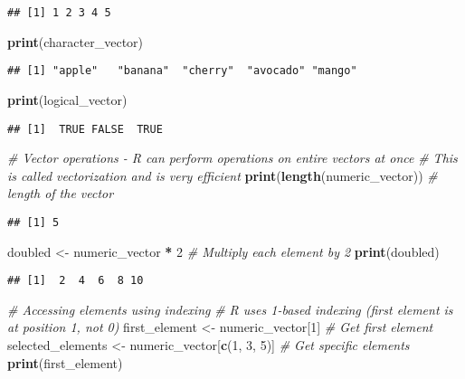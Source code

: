 \documentclass[
]{book}
\newenvironment{Shaded}{\begin{snugshade}}{\end{snugshade}}
\newcommand{\CommentTok}[1]{\textcolor[rgb]{0.56,0.35,0.01}{\textit{#1}}}
\newcommand{\DecValTok}[1]{\textcolor[rgb]{0.00,0.00,0.81}{#1}}
\newcommand{\FunctionTok}[1]{\textcolor[rgb]{0.13,0.29,0.53}{\textbf{#1}}}
\newcommand{\NormalTok}[1]{#1}
\newcommand{\OtherTok}[1]{\textcolor[rgb]{0.56,0.35,0.01}{#1}}
\newcommand{\SpecialCharTok}[1]{\textcolor[rgb]{0.81,0.36,0.00}{\textbf{#1}}}
\begin{document}
\begin{verbatim}
## [1] 1 2 3 4 5
\end{verbatim}

\begin{Shaded}
\begin{Highlighting}[]
\FunctionTok{print}\NormalTok{(character\_vector)}
\end{Highlighting}
\end{Shaded}

\begin{verbatim}
## [1] "apple"   "banana"  "cherry"  "avocado" "mango"
\end{verbatim}

\begin{Shaded}
\begin{Highlighting}[]
\FunctionTok{print}\NormalTok{(logical\_vector)}
\end{Highlighting}
\end{Shaded}

\begin{verbatim}
## [1]  TRUE FALSE  TRUE
\end{verbatim}

\begin{Shaded}
\begin{Highlighting}[]
\CommentTok{\# Vector operations {-} R can perform operations on entire vectors at once}
\CommentTok{\# This is called vectorization and is very efficient}
\FunctionTok{print}\NormalTok{(}\FunctionTok{length}\NormalTok{(numeric\_vector)) }\CommentTok{\# length of the vector}
\end{Highlighting}
\end{Shaded}

\begin{verbatim}
## [1] 5
\end{verbatim}

\begin{Shaded}
\begin{Highlighting}[]
\NormalTok{doubled }\OtherTok{\textless{}{-}}\NormalTok{ numeric\_vector }\SpecialCharTok{*} \DecValTok{2}  \CommentTok{\# Multiply each element by 2}
\FunctionTok{print}\NormalTok{(doubled)}
\end{Highlighting}
\end{Shaded}

\begin{verbatim}
## [1]  2  4  6  8 10
\end{verbatim}

\begin{Shaded}
\begin{Highlighting}[]
\CommentTok{\# Accessing elements using indexing}
\CommentTok{\# R uses 1{-}based indexing (first element is at position 1, not 0)}
\NormalTok{first\_element }\OtherTok{\textless{}{-}}\NormalTok{ numeric\_vector[}\DecValTok{1}\NormalTok{]  }\CommentTok{\# Get first element}
\NormalTok{selected\_elements }\OtherTok{\textless{}{-}}\NormalTok{ numeric\_vector[}\FunctionTok{c}\NormalTok{(}\DecValTok{1}\NormalTok{, }\DecValTok{3}\NormalTok{, }\DecValTok{5}\NormalTok{)]  }\CommentTok{\# Get specific elements}
\FunctionTok{print}\NormalTok{(first\_element)}
\end{Highlighting}
\end{Shaded}
\end{document}
